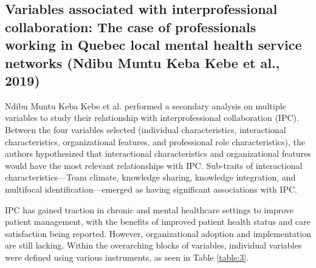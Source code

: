 \documentclass[sn-nature]{sn-jnl}%
\theoremstyle{thmstyleone}%
\theoremstyle{thmstyletwo}%
\theoremstyle{thmstylethree}%
\begin{document}
\subsection{Variables associated with interprofessional collaboration: The case of professionals working in Quebec local mental health service networks (Ndibu Muntu Keba Kebe et al., 2019)\cite{ndibu_muntu_keba_kebe_variables_2019}}
Ndibu Muntu Keba Kebe et al. performed a secondary analysis on multiple variables to study their relationship with interprofessional collaboration (IPC). Between the four variables selected (individual characteristics, interactional characteristics, organizational features, and professional role characteristics), the authors hypothesized that interactional characteristics and organizational features would have the most relevant relationships with IPC. Sub-traits of interactional characteristics—Team climate, knowledge sharing, knowledge integration, and multifocal identification—emerged as having significant associations with IPC\cite{ndibu_muntu_keba_kebe_variables_2019}.

IPC has gained traction in chronic and mental healthcare settings to improve patient management, with the benefits of improved patient health status and care satisfaction being reported. However, organizational adoption and implementation are still lacking. Within the overarching blocks of variables, individual variables were defined using various instruments, as seen in Table \ref{table:3}. \\
\end{document}
